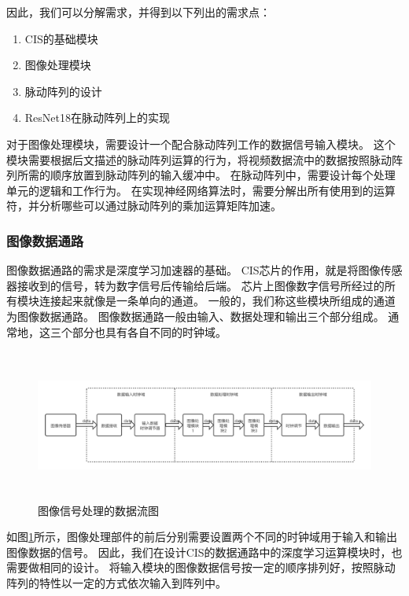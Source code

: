 因此，我们可以分解需求，并得到以下列出的需求点：
\begin{enumerate}
    \item CIS的基础模块
    \item 图像处理模块
    \item 脉动阵列的设计
    \item ResNet18在脉动阵列上的实现
\end{enumerate}    

对于图像处理模块，需要设计一个配合脉动阵列工作的数据信号输入模块。
这个模块需要根据后文描述的脉动阵列运算的行为，将视频数据流中的数据按照脉动阵列所需的顺序放置到脉动阵列的输入缓冲中。
在脉动阵列中，需要设计每个处理单元的逻辑和工作行为。
在实现神经网络算法时，需要分解出所有使用到的运算符，并分析哪些可以通过脉动阵列的乘加运算矩阵加速。


\subsubsection{图像数据通路}
图像数据通路的需求是深度学习加速器的基础。
CIS芯片的作用，就是将图像传感器接收到的信号，转为数字信号后传输给后端。
芯片上图像数字信号所经过的所有模块连接起来就像是一条单向的通道。
一般的，我们称这些模块所组成的通道为图像数据通路。
图像数据通路一般由输入、数据处理和输出三个部分组成。
通常地，这三个部分也具有各自不同的时钟域。

\begin{figure}[htbp]
    \centering
    \includegraphics[width=15cm,height=5cm]{figures/datapath.png}
    \caption{图像信号处理的数据流图}
    \label{fig:datapath}
\end{figure}

如图\ref{fig:datapath}所示，图像处理部件的前后分别需要设置两个不同的时钟域用于输入和输出图像数据的信号。
因此，我们在设计CIS的数据通路中的深度学习运算模块时，也需要做相同的设计。
将输入模块的图像数据信号按一定的顺序排列好，按照脉动阵列的特性以一定的方式依次输入到阵列中。


